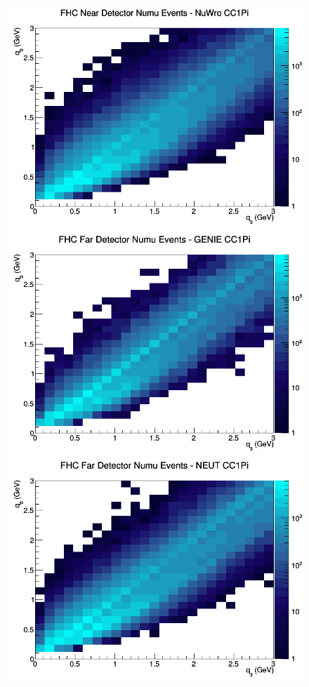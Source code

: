 \documentclass[12pt]{article}
\begin{document}
\begin{figure}[h]
\includegraphics[width=\linewidth]{eff_q0_q3/GAr/CC1Pi_FHC_ND_numu_q3_q0_NuWro.png}
\endminipage
\newline
{}
\includegraphics[width=\linewidth]{eff_q0_q3/GAr/CC1Pi_FHC_FD_numu_q3_q0_GENIE.png}
\endminipage
{}
\includegraphics[width=\linewidth]{eff_q0_q3/GAr/CC1Pi_FHC_FD_numu_q3_q0_NEUT.png}

\end{figure}
\end{document}
